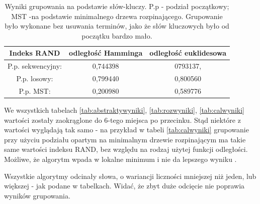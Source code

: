 \documentclass{article}
\begin{document}
\begin{table}[H]
	\centering
	\begin{tabular}{c|c|c}
		Indeks RAND & odległość Hamminga & odległość euklidesowa \\ \hline
		P.p. sekwencyjny: & 0,744398 & 0793137, \\ \hline
		P.p. losowy: & 0,799440 & 0,800560  \\ \hline
		P.p. MST: & 0,200980 & 0,589776 
	\end{tabular}
	\caption{Wyniki grupowania na podstawie słów-kluczy. P.p - podział początkowy; MST -na podstawie minimalnego drzewa rozpinającego. Grupowanie było wykonane bez usuwania terminów, jako że słów kluczowych było od początku bardzo mało.}
	\label{tab:keywordswyniki}
\end{table}

We wszystkich tabelach \ref{tab:abstraktywyniki}, \ref{tab:rozwyniki}, \ref{tab:calwyniki} wartości zostały zaokrąglone do 6-tego miejsca po przecinku. Stąd niektóre z wartości wyglądają tak samo - na przykład w tabeli \ref{tab:calwyniki} grupowanie przy użyciu podziału opartym na minimalnym drzewie rozpinającym ma takie same wartości indeksu RAND, bez względu na rodzaj użytej funkcji odległości. Możliwe, że algorytm wpada w lokalne minimum i nie da lepszego wyniku . 

Wszystkie algorytmy odcinały słowa, o wariancji liczności mniejszej niż jeden, lub większej - jak podane w tabelkach. Widać, że zbyt duże odcięcie nie poprawia wyników grupowania.

\newpage
\end{document}
